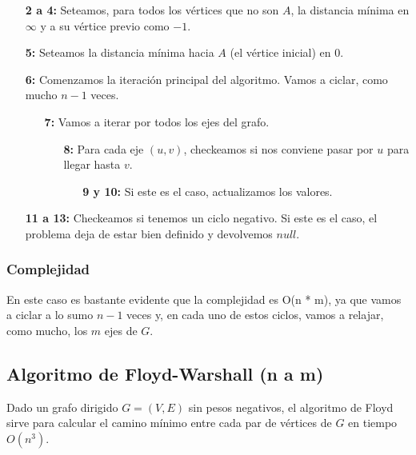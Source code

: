 \begin{enumerate}
\item [\textbf{2 a 4:}] Seteamos, para todos los v\'ertices que no son $A$, la distancia m\'inima en $\infty$ y a su v\'ertice previo como $-1$.
\item [\textbf{5:}] Seteamos la distancia m\'inima hacia $A$ (el v\'ertice inicial) en $0$.
\item [\textbf{6:}] Comenzamos la iteraci\'on principal del algoritmo. Vamos a ciclar, como mucho $n-1$ veces.
    \begin{enumerate}
    \item [\textbf{7:}] Vamos a iterar por todos los ejes del grafo.
        \begin{enumerate}
        \item [\textbf{8:}] Para cada eje $(u, v)$, checkeamos si nos conviene pasar por $u$ para llegar hasta $v$.
            \begin{enumerate}
            \item [\textbf{9 y 10:}] Si este es el caso, actualizamos los valores.
            \end{enumerate}
        \end{enumerate}
    \end{enumerate}
\item [\textbf{11 a 13:}] Checkeamos si tenemos un ciclo negativo. Si este es el caso, el problema deja de estar bien definido y devolvemos $null$.
\end{enumerate}

\subsubsection*{Complejidad}

En este caso es bastante evidente que la complejidad es O(n * m), ya que vamos a ciclar a lo sumo $n-1$ veces y, en cada uno de estos ciclos, vamos a relajar, como mucho, los $m$ ejes de $G$.

\newpage
\subsection{Algoritmo de Floyd-Warshall (n a m)}

Dado un grafo dirigido $G = (V, E)$ sin pesos negativos, el algoritmo de Floyd sirve para calcular el camino m\'inimo entre cada par de v\'ertices de $G$ en tiempo $O(n^3)$.


